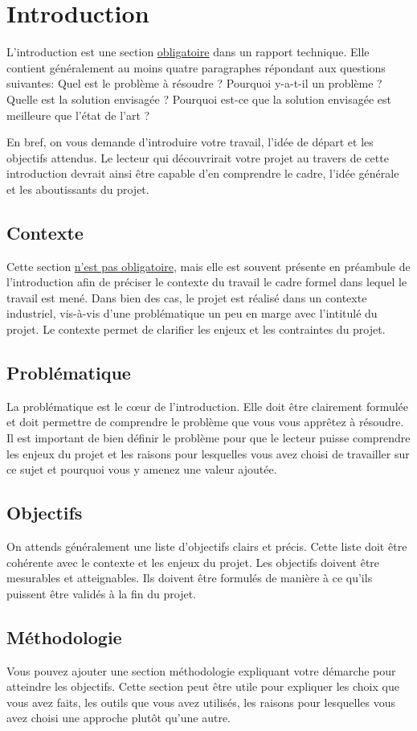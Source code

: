 \chapter{Introduction}

L'introduction est une section \underline{obligatoire} dans un rapport technique. Elle contient généralement au moins quatre paragraphes répondant aux questions suivantes: Quel est le problème à résoudre ? Pourquoi y-a-t-il un problème ? Quelle est la solution envisagée ? Pourquoi est-ce que la solution envisagée est meilleure que l'état de l'art ?

En bref, on vous demande d'introduire votre travail, l'idée de départ et les objectifs attendus. Le lecteur qui découvrirait votre projet au travers de cette introduction devrait ainsi être capable d'en comprendre le cadre, l'idée générale et les aboutissants du projet.

\section{Contexte}

Cette section \underline{n'est pas obligatoire}, mais elle est souvent présente en préambule de l'introduction afin de préciser le contexte du travail \cad le cadre formel dans lequel le travail est mené. Dans bien des cas, le projet est réalisé dans un contexte industriel, vis-à-vis d'une problématique un peu en marge avec l'intitulé du projet. Le contexte permet de clarifier les enjeux et les contraintes du projet.

\section{Problématique}

La problématique est le cœur de l'introduction. Elle doit être clairement formulée et doit permettre de comprendre le problème que vous vous apprêtez à résoudre. Il est important de bien définir le problème pour que le lecteur puisse comprendre les enjeux du projet et les raisons pour lesquelles vous avez choisi de travailler sur ce sujet et pourquoi vous y amenez une valeur ajoutée.

\section{Objectifs}

On attends généralement une liste d'objectifs clairs et précis. Cette liste doit être cohérente avec le contexte et les enjeux du projet. Les objectifs doivent être mesurables et atteignables. Ils doivent être formulés de manière à ce qu'ils puissent être validés à la fin du projet.

\section{Méthodologie}

Vous pouvez ajouter une section méthodologie expliquant votre démarche pour atteindre les objectifs. Cette section peut être utile pour expliquer les choix que vous avez faits, les outils que vous avez utilisés, les raisons pour lesquelles vous avez choisi une approche plutôt qu'une autre.
